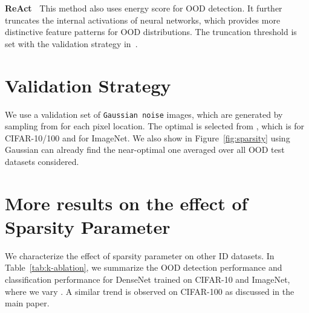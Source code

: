 \documentclass[runningheads]{llncs}
\begin{document}
\noindent \textbf{ReAct~\cite{sun2021react}} This method also uses energy score for OOD detection. It further truncates the internal activations of neural networks, which provides more distinctive feature patterns for OOD distributions. The truncation threshold is set with the validation strategy in~\cite{sun2021react}.


\section{Validation Strategy}
\label{app:val}
We use a validation set of \texttt{Gaussian noise} images, which are generated by sampling from  for each pixel location.
The optimal  is selected from , which is  for CIFAR-10/100 and  for ImageNet.
We also show in Figure~\ref{fig:sparsity} using Gaussian can already find the near-optimal one averaged over all OOD test datasets considered. 




\section{More results on the effect of Sparsity Parameter  } 
\label{sec:ood-sparsep}
We characterize  the effect of sparsity parameter  on other ID datasets.  In Table~\ref{tab:k-ablation}, we summarize the OOD detection performance and classification performance for DenseNet trained on CIFAR-10 and ImageNet, where we vary . A similar trend is observed on CIFAR-100 as discussed in the main paper. 




\begin{table*}[htb] 
\caption[]{\small Effect of varying sparsity parameter . Results are averaged on the test datasets described in Section~\ref{sec:experiments}.}
\label{tab:k-ablation}
\centering
\footnotesize
{}

\end{table*}
\end{document}
